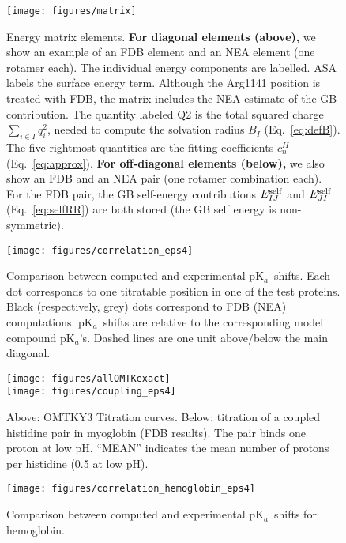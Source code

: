 \documentclass[a4paper,12pt]{article}
\newcommand{\pk}{pK$_a$}
\begin{document}
\begin{figure}[h]
\centering
\texttt{[image: figures/matrix]} 
\caption{Energy matrix elements. {\bf For diagonal elements (above),} we show an example of an FDB element and an NEA element
  (one rotamer each). The individual energy components are labelled. ASA labels the surface energy term. Although the Arg1141
  position is treated with FDB, the matrix includes the NEA estimate of the GB contribution. The quantity labeled Q2 is the total
  squared charge $\sum_{i \in I} q_i^2$, needed to compute the solvation radius $B_I$ (Eq.\ \ref{eq:defB}). The five rightmost
  quantities are the fitting coefficients $c^{II}_n$ (Eq.\ \ref{eq:approx}). {\bf For off-diagonal elements (below),} we also
  show an FDB and an NEA pair (one rotamer combination each). For the FDB pair, the GB self-energy contributions $E_{IJ}^{\rm self}$
  and $E_{JI}^{\rm self}$ (Eq.\ \ref{eq:selfRR}) are both stored (the GB self energy is non-symmetric).} \label{fig:matrix}  
\end{figure}


\begin{figure}[h]
\centering
\texttt{[image: figures/correlation\_eps4]} 
\caption{Comparison between computed and experimental \pk\ shifts. Each dot corresponds to one titratable position in one
  of the test proteins. Black (respectively, grey) dots correspond to FDB (NEA) computations. \pk\ shifts are relative
to the corresponding model compound \pk's. Dashed lines are one unit above/below the main diagonal.} \label{fig:correl}  
\end{figure}


\begin{figure}[h]
\centering
\texttt{[image: figures/allOMTKexact]} \\
\texttt{[image: figures/coupling\_eps4]}
\caption{Above: OMTKY3 Titration curves. Below: titration of a coupled histidine pair in myoglobin (FDB results). The
pair binds one proton at low pH. ``MEAN'' indicates the mean number of protons per histidine (0.5 at low pH).} \label{fig:titrate}  
\end{figure}


\begin{figure}[h]
\centering
\texttt{[image: figures/correlation\_hemoglobin\_eps4]} 
\caption{Comparison between computed and experimental \pk\ shifts for hemoglobin.} \label{fig:hbcorrel}  
\end{figure}
\end{document}
